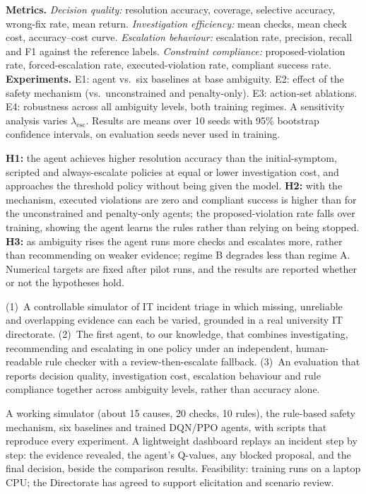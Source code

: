 \documentclass[10pt,a4paper]{article}
\newcommand{\sect}[1]{\par\vspace{3pt}{\bfseries\large #1}\par}
\newcommand{\sub}[1]{\par\vspace{1pt}{\bfseries #1}\par}
\begin{document}
\sub{5.6 Evaluation}
\textbf{Metrics.} \emph{Decision quality:} resolution accuracy, coverage, selective accuracy, wrong-fix rate, mean return. \emph{Investigation efficiency:} mean checks, mean check cost, accuracy--cost curve. \emph{Escalation behaviour:} escalation rate, precision, recall and F1 against the reference labels. \emph{Constraint compliance:} proposed-violation rate, forced-escalation rate, executed-violation rate, compliant success rate. \textbf{Experiments.} E1: agent vs.\ six baselines at base ambiguity. E2: effect of the safety mechanism (vs.\ unconstrained and penalty-only). E3: action-set ablations. E4: robustness across all ambiguity levels, both training regimes. A sensitivity analysis varies $\lambda_{\text{esc}}$. Results are means over 10 seeds with 95\% bootstrap confidence intervals, on evaluation seeds never used in training.

\sub{5.7 Expected results}
\textbf{H1:} the agent achieves higher resolution accuracy than the initial-symptom, scripted and always-escalate policies at equal or lower investigation cost, and approaches the threshold policy without being given the model. \textbf{H2:} with the mechanism, executed violations are zero and compliant success is higher than for the unconstrained and penalty-only agents; the proposed-violation rate falls over training, showing the agent learns the rules rather than relying on being stopped. \textbf{H3:} as ambiguity rises the agent runs more checks and escalates more, rather than recommending on weaker evidence; regime B degrades less than regime A. Numerical targets are fixed after pilot runs, and the results are reported whether or not the hypotheses hold.

\sect{6. Research Contribution}
(1)~A controllable simulator of IT incident triage in which missing, unreliable and overlapping evidence can each be varied, grounded in a real university IT directorate. (2)~The first agent, to our knowledge, that combines investigating, recommending and escalating in one policy under an independent, human-readable rule checker with a review-then-escalate fallback. (3)~An evaluation that reports decision quality, investigation cost, escalation behaviour and rule compliance together across ambiguity levels, rather than accuracy alone.

\sect{7. Expected Prototype}
A working simulator (about 15 causes, 20 checks, 10 rules), the rule-based safety mechanism, six baselines and trained DQN/PPO agents, with scripts that reproduce every experiment. A lightweight dashboard replays an incident step by step: the evidence revealed, the agent's Q-values, any blocked proposal, and the final decision, beside the comparison results. Feasibility: training runs on a laptop CPU; the Directorate has agreed to support elicitation and scenario review.
\end{document}
